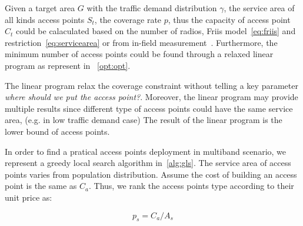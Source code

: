 Given a target area $G$ with the traffic demand distribution $\gamma$, the service area 
of all kinds access points $S_t$, the coverage rate $p$, thus the capacity of access point $C_t$ could 
be calaculated based on the number of radios, Friis model~\ref{eq:friis} and restriction~\ref{eq:servicearea}
or from in-field measurement~\cite{cuileveraging}. Furthermore, the minimum number of access points 
could be found through a relaxed linear program as represent in ~\ref{opt:opt}. 



The linear program relax the coverage constraint without telling a key parameter
{\it where should we put the access point?}. Moreover, the linear program may provide 
multiple results since different type of access points could have the same service area, 
(e.g. in low traffic demand case) The result of the linear program is the lower bound of 
access points. 

In order to find a pratical access points deployment in multiband scenario, we represent 
a greedy local search algorithm in~\ref{alg:gls}. The service area of access points varies 
from population distribution. Assume the cost of building an access point is the same as $C_a$. 
Thus, we rank the access points type according to their unit price as:

\begin{equation}
\label{eq:unitprice}
p_s=C_a/A_s
\end{equation}

